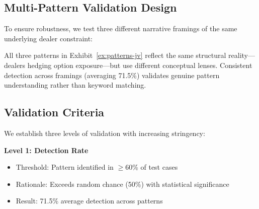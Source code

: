 \subsection{Multi-Pattern Validation Design}

To ensure robustness, we test three different narrative framings of the same underlying dealer constraint:

\begin{table}[h]
\centering
\caption{Three Pattern Framings of Dealer Hedging Constraints}
\label{ex:patterns-jv}
\end{table}

All three patterns in Exhibit~\ref{ex:patterns-jv} reflect the same structural reality—dealers hedging option exposure—but use different conceptual lenses. Consistent detection across framings (averaging 71.5\%) validates genuine pattern understanding rather than keyword matching.

\subsection{Validation Criteria}

We establish three levels of validation with increasing stringency:

\textbf{Level 1: Detection Rate}
\begin{itemize}
\item Threshold: Pattern identified in $\geq$60\% of test cases
\item Rationale: Exceeds random chance (50\%) with statistical significance
\item Result: 71.5\% average detection across patterns
\end{itemize}

